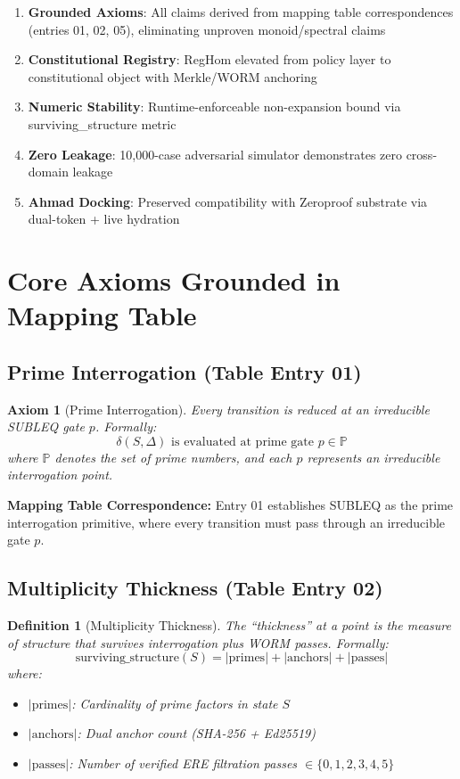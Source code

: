 \documentclass[11pt,a4paper]{article}
\newtheorem{definition}[theorem]{Definition}
\newtheorem{axiom}[theorem]{Axiom}
\begin{document}
\begin{enumerate}
    \item \textbf{Grounded Axioms}: All claims derived from mapping table correspondences (entries 01, 02, 05), eliminating unproven monoid/spectral claims
    \item \textbf{Constitutional Registry}: RegHom elevated from policy layer to constitutional object with Merkle/WORM anchoring
    \item \textbf{Numeric Stability}: Runtime-enforceable non-expansion bound via surviving\_structure metric
    \item \textbf{Zero Leakage}: 10,000-case adversarial simulator demonstrates zero cross-domain leakage
    \item \textbf{Ahmad Docking}: Preserved compatibility with Zeroproof substrate via dual-token + live hydration
\end{enumerate}

\section{Core Axioms Grounded in Mapping Table}

\subsection{Prime Interrogation (Table Entry 01)}

\begin{axiom}[Prime Interrogation]\label{axiom:prime}
Every transition is reduced at an irreducible SUBLEQ gate $p$. Formally:
$$\delta(S, \Delta) \text{ is evaluated at prime gate } p \in \mathbb{P}$$
where $\mathbb{P}$ denotes the set of prime numbers, and each $p$ represents an irreducible interrogation point.
\end{axiom}

\textbf{Mapping Table Correspondence:} Entry 01 establishes SUBLEQ as the prime interrogation primitive, where every transition must pass through an irreducible gate $p$.

\subsection{Multiplicity Thickness (Table Entry 02)}

\begin{definition}[Multiplicity Thickness]\label{def:thickness}
The ``thickness'' at a point is the measure of structure that survives interrogation plus WORM passes. Formally:
$$\text{surviving\_structure}(S) = |\text{primes}| + |\text{anchors}| + |\text{passes}|$$
where:
\begin{itemize}
    \item $|\text{primes}|$: Cardinality of prime factors in state $S$
    \item $|\text{anchors}|$: Dual anchor count (SHA-256 + Ed25519)
    \item $|\text{passes}|$: Number of verified ERE filtration passes $\in \{0,1,2,3,4,5\}$
\end{itemize}
\end{definition}
\end{document}
